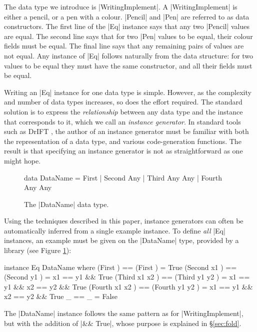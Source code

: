 \documentclass{llncs}
\begin{document}
The data type we introduce is |WritingImplement|. A |WritingImplement| is either a pencil, or a pen with a colour. |Pencil| and |Pen| are referred to as data constructors. The first line of the |Eq| instance says that any two |Pencil| values are equal. The second line says that for two |Pen| values to be equal, their colour fields must be equal. The final line says that any remaining pairs of values are not equal. Any instance of |Eq| follows naturally from the data structure: for two values to be equal they must have the same constructor, and all their fields must be equal.

Writing an |Eq| instance for one data type is simple. However, as the complexity and number of data types increases, so does the effort required. The standard solution is to express the \textit{relationship} between any data type and the instance that corresponds to it, which we call an \textit{instance generator}. In standard tools such as DrIFT \cite{drift}, the author of an instance generator must be familiar with both the representation of a data type, and various code-generation functions. The result is that specifying an instance generator is not as straightforward as one might hope.

\begin{figure}[tbp]
\begin{code}
data DataName  =  First
               |  Second  Any
               |  Third   Any  Any
               |  Fourth  Any  Any
\end{code}
\caption{The |DataName| data type.}
\label{fig:dataname}
\end{figure}

Using the techniques described in this paper, instance generators can often be automatically inferred from a single example instance. To define \textit{all} |Eq| instances, an example must be given on the |DataName| type, provided by a library (see Figure \ref{fig:dataname}):

\begin{code}
instance Eq DataName where
    (First          )  == (First          )  = True
    (Second  x1     )  == (Second  y1     )  = x1 == y1 && True
    (Third   x1 x2  )  == (Third   y1 y2  )  = x1 == y1 && x2 == y2 && True
    (Fourth  x1 x2  )  == (Fourth  y1 y2  )  = x1 == y1 && x2 == y2 && True
    _                  == _                  = False
\end{code}

The |DataName| instance follows the same pattern as for |WritingImplement|, but with the addition of |&& True|, whose purpose is explained in \S\ref{sec:fold}.
\end{document}

